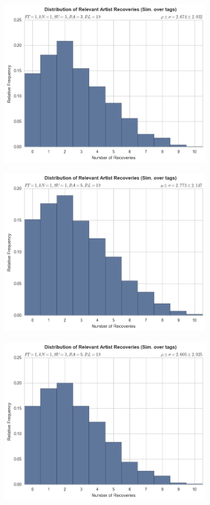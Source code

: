 \documentclass[12pt]{article}
\begin{document}
\begin{figure}[h!]
\begin{subfigure}
  \end{subfigure}
  \begin{subfigure}
      \centering
    \includegraphics[height=2.8in]{tags,FT=1,kN=1,SU=3,RA=3,RL=10.png}
  \end{subfigure}
  \begin{subfigure}
      \centering
    \includegraphics[height=2.8in]{tags,FT=1,kN=1,SU=1,RA=5,RL=10.png}
  \end{subfigure}
  \begin{subfigure}
      \centering
    \includegraphics[height=2.8in]{tags,FT=1,kN=1,SU=3,RA=5,RL=10.png}
  \end{subfigure}
\end{figure}
\end{document}

